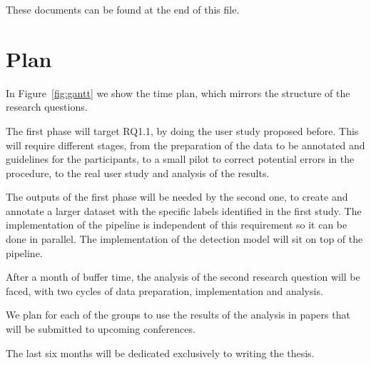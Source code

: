 These documents can be found at the end of this file.






\section{Plan}


In Figure~\ref{fig:gantt} we show the time plan, which mirrors the structure of the research questions.

The first phase will target RQ1.1, by doing the user study proposed before. This will require different stages, from the preparation of the data to be annotated and guidelines for the participants, to a small pilot to correct potential errors in the procedure, to the real user study and analysis of the results.

The outputs of the first phase will be needed by the second one, to create and annotate a larger dataset with the specific labels identified in the first study. The implementation of the pipeline is independent of this requirement so it can be done in parallel. The implementation of the detection model will sit on top of the pipeline.

After a month of buffer time, the analysis of the second research question will be faced, with two cycles of data preparation, implementation and analysis.

We plan for each of the groups to use the results of the analysis in papers that will be submitted to upcoming conferences.

The last six months will be dedicated exclusively to writing the thesis.

